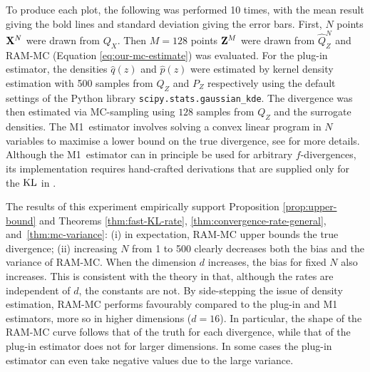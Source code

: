 To produce each plot, the following was performed 10 times, with the mean result giving the bold lines and standard deviation giving the error bars.
First, $N$ points $\mathbf{X}^N$ were drawn from $Q_X$. 
Then $M{=}128$ points $\mathbf{Z}^M$ were drawn from $\hat{Q}_Z^N$ and RAM-MC (Equation \ref{eq:our-mc-estimate}) was evaluated. 
For the plug-in estimator, the densities $\hat{q}(z)$ and $\hat{p}(z)$ were estimated by kernel density estimation with 500 samples from $Q_Z$ and $P_Z$ respectively using the default settings of the Python library {\texttt{scipy.stats.gaussian\_kde}}.
The divergence was then estimated via MC-sampling using $128$ samples from $Q_Z$ and the surrogate densities.
The M1~estimator involves solving a convex linear program in $N$ variables to maximise a lower bound on the true divergence, see \cite{nguyen10ratio} for more details.
Although the M1~estimator can in principle be used for arbitrary $f$-divergences, its implementation requires hand-crafted derivations that are supplied only for the $\mathrm{KL}$ in \cite{nguyen10ratio}.

The results of this experiment empirically support Proposition \ref{prop:upper-bound} and Theorems \ref{thm:fast-KL-rate}, \ref{thm:convergence-rate-general}, and~\ref{thm:mc-variance}:
(i) in expectation, RAM-MC upper bounds the true divergence; (ii) increasing $N$ from 1 to 500 clearly decreases both the bias and the variance of RAM-MC.
When the dimension $d$ increases, the bias for fixed $N$ also increases.
This is consistent with the theory in that, although the rates are independent of $d$, the constants are not.
By side-stepping the issue of density estimation, RAM-MC performs favourably compared to the plug-in and M1 estimators, more so in higher dimensions ($d=16$).
In particular, the shape of the RAM-MC curve follows that of the truth for each divergence, while that of the plug-in estimator does not for larger dimensions.
In some cases the plug-in estimator can even take negative values due to the large variance.




